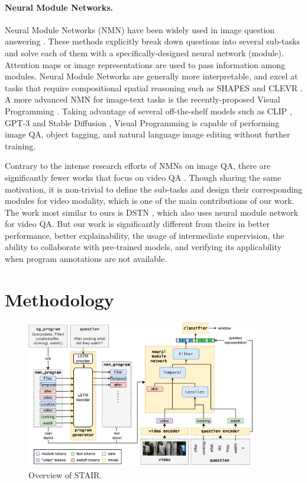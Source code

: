 \documentclass[letterpaper]{article} %
\begin{document}
\paragraph{Neural Module Networks.} 
Neural Module Networks (NMN) have been widely used in image question answering \cite{Andreas2015NeuralMN,Hu2017LearningTR,Johnson2017InferringAE,Mascharka2018TransparencyBD,Hu2018ExplainableNC}. These methods explicitly break down questions into several sub-tasks and solve each of them with a specifically-designed neural network (module). Attention maps or image representations are used to pass information among modules. Neural Module Networks are generally more interpretable, and excel at tasks that require compositional spatial reasoning such as SHAPES \cite{Andreas2015NeuralMN} and CLEVR \cite{Johnson2016CLEVRAD}.
A more advanced NMN for image-text tasks is the recently-proposed Visual Programming \cite{Gupta2023VisualProgramming}.
Taking advantage of several off-the-shelf models such as CLIP \cite{Radford2021LearningTV}, GPT-3 \cite{Brown2020LanguageMA} and Stable Diffusion \cite{rombach2021highresolution}, Visual Programming is capable of performing image QA, object tagging, and natural language image editing without further training.

Contrary to the intense research efforts of NMNs on image QA, there are significantly fewer works that focus on video QA \cite{Le2022VGNMNVN, Qian2022DynamicSM}. Though sharing the same motivation, it is non-trivial to define the sub-tasks and design their corresponding modules for video modality, which is one of the main contributions of our work. The work most similar to ours is DSTN \cite{Qian2022DynamicSM}, which also uses neural module network for video QA. But our work is significantly different from theirs in better performance, better explainability, the usage of intermediate supervision, the ability to collaborate with pre-trained models, and verifying its applicability when program annotations are not available.

\section{Methodology}
\begin{figure}[t]
    \centering
    \includegraphics[width=0.9\textwidth]{plt/overview.png}
    \caption{Overview of STAIR.}
    \label{fig:overview}
\end{figure}
\end{document}

